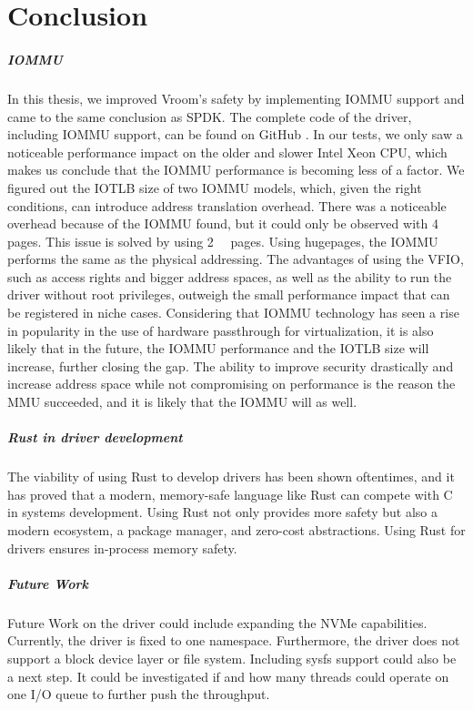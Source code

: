 \chapter{Conclusion}
\paragraph{IOMMU}
In this thesis, we improved Vroom's safety by implementing IOMMU support and came to the same conclusion as SPDK. The complete code of the driver, including IOMMU support, can be found on GitHub \cite{vroomsource}.
In our tests, we only saw a noticeable performance impact on the older and slower Intel Xeon CPU, which makes us conclude that the IOMMU performance is becoming less of a factor.
We figured out the IOTLB size of two IOMMU models, which, given the right conditions, can introduce address translation overhead.
There was a noticeable overhead because of the IOMMU found, but it could only be observed with \qty{4}{\kibi\byte} pages. This issue is solved by using \qty{2}{\mebi\byte} pages. Using hugepages, the IOMMU performs the same as the physical addressing.
The advantages of using the VFIO, such as access rights and bigger address spaces, as well as the ability to run the driver without root privileges, outweigh the small performance impact that can be registered in niche cases.
Considering that IOMMU technology has seen a rise in popularity in the use of hardware passthrough for virtualization, it is also likely that in the future, the IOMMU performance and the IOTLB size will increase, further closing the gap. The ability to improve security drastically and increase address space while not compromising on performance is the reason the MMU succeeded, and it is likely that the IOMMU will as well.

\paragraph{Rust in driver development}
The viability of using Rust to develop drivers has been shown oftentimes, and it has proved that a modern, memory-safe language like Rust can compete with C in systems development. Using Rust not only provides more safety but also a modern ecosystem, a package manager, and zero-cost abstractions. Using Rust for drivers ensures in-process memory safety.

\paragraph{Future Work}
Future Work on the driver could include expanding the NVMe capabilities. Currently, the driver is fixed to one namespace. Furthermore, the driver does not support a block device layer or file system. Including sysfs support could also be a next step.
It could be investigated if and how many threads could operate on one I/O queue to further push the throughput.